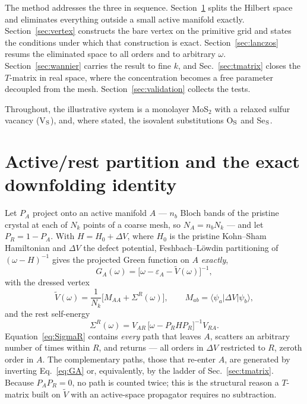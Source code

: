 \documentclass[aps,prx,reprint,superscriptaddress,nofootinbib,longbibliography]{revtex4-2}
\newcommand{\dV}{\Delta V}
\newcommand{\Vt}{\widetilde{V}}
\begin{document}
The method addresses the three in sequence. Section~\ref{sec:downfold} splits
the Hilbert space and eliminates everything outside a small active manifold
exactly. Section~\ref{sec:vertex} constructs the bare vertex on the primitive
grid and states the conditions under which that construction is exact.
Section~\ref{sec:lanczos} resums the eliminated space to all orders and to
arbitrary $\omega$. Section~\ref{sec:wannier} carries the result to fine $k$,
and Sec.~\ref{sec:tmatrix} closes the $T$-matrix in real space, where the
concentration becomes a free parameter decoupled from the mesh.
Section~\ref{sec:validation} collects the tests.

Throughout, the illustrative system is a monolayer MoS$_2$ with a relaxed
sulfur vacancy (V$_{\rm S}$), and, where stated, the isovalent substitutions
O$_{\rm S}$ and Se$_{\rm S}$.


\section{Active/rest partition and the exact downfolding identity}
\label{sec:downfold}

Let $P_A$ project onto an active manifold $A$ --- $n_b$ Bloch bands of the
pristine crystal at each of $N_k$ points of a coarse mesh, so
$N_A = n_b N_k$ --- and let $P_R = 1 - P_A$. With $H = H_0 + \dV$, where
$H_0$ is the pristine Kohn--Sham Hamiltonian and $\dV$ the defect potential,
Feshbach--L\"owdin partitioning of $(\omega - H)^{-1}$ gives the projected
Green function on $A$ \emph{exactly},
\begin{equation}
  G_A(\omega) = \big[\omega - \varepsilon_A - \Vt(\omega)\big]^{-1},
  \label{eq:GA}
\end{equation}
with the dressed vertex
\begin{equation}
  \Vt(\omega) = \frac{1}{N_k}\Big[ M_{AA} + \Sigma^R(\omega) \Big],
  \qquad
  M_{ab} = \langle \psi_a | \dV | \psi_b \rangle ,
  \label{eq:Vtilde}
\end{equation}
and the rest self-energy
\begin{equation}
  \Sigma^R(\omega) = V_{AR}\,\big[\omega - P_R H P_R\big]^{-1} V_{RA}.
  \label{eq:SigmaR}
\end{equation}
Equation~\eqref{eq:SigmaR} contains \emph{every} path that leaves $A$, scatters
an arbitrary number of times within $R$, and returns --- all orders in $\dV$
restricted to $R$, zeroth order in $A$. The complementary paths, those that
re-enter $A$, are generated by inverting Eq.~\eqref{eq:GA} or, equivalently, by
the ladder of Sec.~\ref{sec:tmatrix}. Because $P_A P_R = 0$, no path is
counted twice; this is the structural reason a $T$-matrix built on $\Vt$ with
an active-space propagator requires no subtraction.
\end{document}
